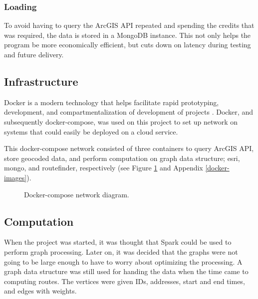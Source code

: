 \documentclass[11 pt]{IEEEtran}
\theoremstyle{definition}
\theoremstyle{definition}
\begin{document}
\subsubsection{Loading}\label{L}
To avoid having to query the ArcGIS API repeated and spending the credits that was required\cite{ArcGIS}, the data is stored in a MongoDB instance. This not only helps the program be more economically efficient, but cuts down on latency during testing and future delivery.

\subsection{Infrastructure}
Docker is a modern technology that helps facilitate rapid prototyping, development, and compartmentalization of development of projects \cite{DOCKER}. Docker, and subsequently docker-compose\cite{DC}, was used on this project to set up network on systems that could easily be deployed on a cloud service. 

This docker-compose network consisted of three containers to query ArcGIS API, store geocoded data, and perform computation on graph data structure; esri, mongo, and routefinder, respectively (see Figure \ref{docker-compose-network-diagram} and Appendix \ref{docker-images}).
\begin{figure}[!htb]
  \begin{center}
      
      \caption{Docker-compose network diagram.}\label{docker-compose-network-diagram}
    \end{center}
\end{figure}


\subsection{Computation}

When the project was started, it was thought that Spark could be used to perform graph processing\cite{SPARK}. Later on, it was decided that the graphs were not going to be large enough to have to worry about optimizing the processing. A graph data structure was still used for handing the data when the time came to computing routes\cite{Agarwal}. The vertices were given IDs, addresses, start and end times, and edges with weights.

\end{document}
